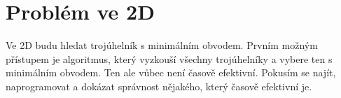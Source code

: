 \chapter{Problém ve 2D}
\label{chap:problem2d}
Ve 2D budu hledat trojúhelník s minimálním obvodem. Prvním možným přístupem je algoritmus, který vyzkouší všechny trojúhelníky a vybere ten s minimálním obvodem. Ten ale vůbec není časově efektivní. Pokusím se najít, naprogramovat a dokázat správnost nějakého, který časově efektivní je. 




\clearpage
